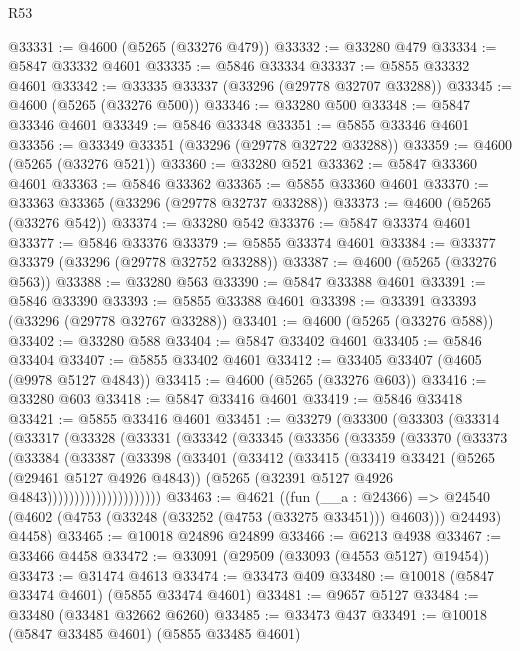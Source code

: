 \begin{lexlean}{R53}
\begin{coremodule}
@33331 := @4600 (@5265 (@33276 @479))
@33332 := @33280 @479
@33334 := @5847 @33332 @4601
@33335 := @5846 @33334
@33337 := @5855 @33332 @4601
@33342 := @33335 @33337 (@33296 (@29778 @32707 @33288))
@33345 := @4600 (@5265 (@33276 @500))
@33346 := @33280 @500
@33348 := @5847 @33346 @4601
@33349 := @5846 @33348
@33351 := @5855 @33346 @4601
@33356 := @33349 @33351 (@33296 (@29778 @32722 @33288))
@33359 := @4600 (@5265 (@33276 @521))
@33360 := @33280 @521
@33362 := @5847 @33360 @4601
@33363 := @5846 @33362
@33365 := @5855 @33360 @4601
@33370 := @33363 @33365 (@33296 (@29778 @32737 @33288))
@33373 := @4600 (@5265 (@33276 @542))
@33374 := @33280 @542
@33376 := @5847 @33374 @4601
@33377 := @5846 @33376
@33379 := @5855 @33374 @4601
@33384 := @33377 @33379 (@33296 (@29778 @32752 @33288))
@33387 := @4600 (@5265 (@33276 @563))
@33388 := @33280 @563
@33390 := @5847 @33388 @4601
@33391 := @5846 @33390
@33393 := @5855 @33388 @4601
@33398 := @33391 @33393 (@33296 (@29778 @32767 @33288))
@33401 := @4600 (@5265 (@33276 @588))
@33402 := @33280 @588
@33404 := @5847 @33402 @4601
@33405 := @5846 @33404
@33407 := @5855 @33402 @4601
@33412 := @33405 @33407 (@4605 (@9978 @5127 @4843))
@33415 := @4600 (@5265 (@33276 @603))
@33416 := @33280 @603
@33418 := @5847 @33416 @4601
@33419 := @5846 @33418
@33421 := @5855 @33416 @4601
@33451 := @33279
    (@33300
      (@33303
        (@33314
          (@33317
            (@33328
              (@33331
                (@33342
                  (@33345
                    (@33356
                      (@33359
                        (@33370
                          (@33373
                            (@33384
                              (@33387
                                (@33398
                                  (@33401
                                    (@33412
                                      (@33415
                                        (@33419
                                          @33421
                                          (@5265 (@29461 @5127 @4926 @4843))
                                          (@5265 (@32391 @5127 @4926 @4843)))))))))))))))))))))
@33463 := @4621
    ((fun (__a : @24366) =>
    @24540 (@4602 (@4753 (@33248 (@33252 (@4753 (@33275 @33451))) @4603))) @24493)
      @4458)
@33465 := @10018 @24896 @24899
@33466 := @6213 @4938
@33467 := @33466 @4458
@33472 := @33091 (@29509 (@33093 (@4553 @5127) @19454))
@33473 := @31474 @4613
@33474 := @33473 @409
@33480 := @10018 (@5847 @33474 @4601) (@5855 @33474 @4601)
@33481 := @9657 @5127
@33484 := @33480 (@33481 @32662 @6260)
@33485 := @33473 @437
@33491 := @10018 (@5847 @33485 @4601) (@5855 @33485 @4601)

\end{coremodule}
\end{lexlean}
